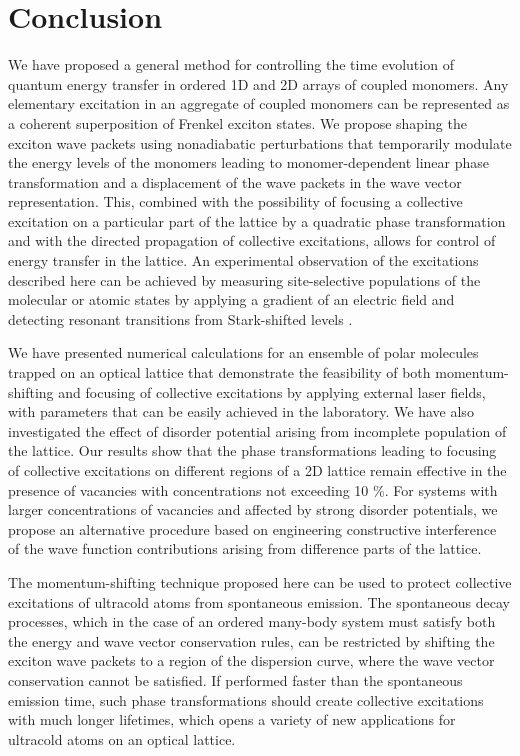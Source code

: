 \section{Conclusion}
\label{sec:energyTransferConclusion}

We have proposed a general method for controlling the time evolution of quantum energy transfer in ordered 1D and 2D arrays of coupled monomers.
Any elementary excitation in an aggregate of coupled
monomers can be represented as a coherent superposition of Frenkel
exciton states. We propose shaping the exciton wave
packets using nonadiabatic perturbations that temporarily
modulate the energy levels of the monomers leading to monomer-dependent linear phase transformation and a
displacement of the wave packets in the wave vector representation.
This, combined with the possibility of focusing a collective excitation on a particular part of the lattice by a quadratic phase transformation and with the directed propagation of collective excitations,
allows for control of energy transfer in the lattice. 
An experimental observation of the excitations described here can be achieved by measuring
 site-selective populations of the molecular or atomic states by applying a gradient of an electric field and
 detecting resonant transitions from Stark-shifted levels \cite{demille}.


We have presented numerical calculations for an ensemble of polar molecules trapped on an optical lattice that demonstrate the feasibility of
both momentum-shifting and focusing of collective excitations by applying external laser fields, with parameters that can be easily achieved in the laboratory.
We have also investigated the effect of disorder potential arising from incomplete population of the lattice. Our results show that the phase transformations
 leading to focusing of collective excitations on different regions of a 2D lattice remain effective in the presence of vacancies
with concentrations not exceeding 10 \%. For systems with larger concentrations of vacancies and affected by strong disorder potentials, we propose an alternative procedure based on engineering constructive interference of the wave function contributions arising from difference parts of the lattice. 


The momentum-shifting technique proposed here can be used to protect collective excitations of ultracold atoms from spontaneous emission. 
 The spontaneous decay processes, which in the case of an ordered many-body
system must satisfy both the energy and wave vector conservation rules, can be restricted by shifting the exciton
 wave packets to a region of the dispersion curve, where the wave vector conservation cannot be satisfied.
If performed faster than the spontaneous emission time, such phase transformations should create collective
excitations with much longer lifetimes, which opens a variety of new applications for ultracold atoms on an optical
lattice.




